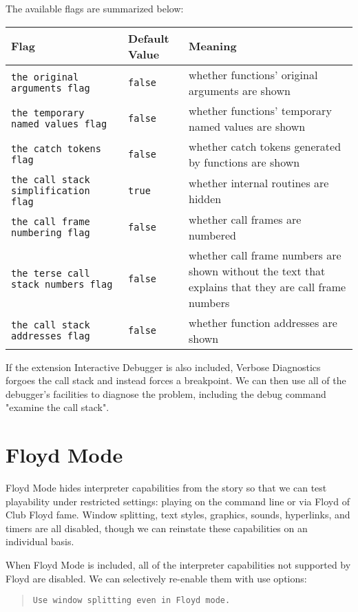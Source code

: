 \documentclass{book}
\newcommand{\impatiencechapter}[1]{\chapter{#1}\addcontentsline{toi}{chapter}{#1}}
\begin{document}
\begin{quote}
  
\end{quote}

The available flags are summarized below:

\hbox{}
\begin{longtable}{llp{6cm}}
  \midrule
  \textbf{Flag}&\textbf{Default Value}&\textbf{Meaning}\\
  \midrule
  \texttt{the original arguments flag}&\texttt{false}&whether functions' original arguments are shown\\
  \texttt{the temporary named values flag}&\texttt{false}&whether functions' temporary named values are shown\\
  \texttt{the catch tokens flag}&\texttt{false}&whether catch tokens generated by functions are shown\\
  \texttt{the call stack simplification flag}&\texttt{true}&whether internal routines are hidden\\
  \texttt{the call frame numbering flag}&\texttt{false}&whether call frames are numbered\\
  \texttt{the terse call stack numbers flag}&\texttt{false}&whether call frame numbers are shown without the text that explains that they are call frame numbers\\
  \texttt{the call stack addresses flag}&\texttt{false}&whether function addresses are shown\\
  \midrule
\end{longtable}

If the extension Interactive Debugger is also included, Verbose Diagnostics
forgoes the call stack and instead forces a breakpoint.  We can then use all of
the debugger's facilities to diagnose the problem, including the debug command
"examine the call stack".

\impatiencechapter{Floyd Mode}
\label{floyd-mode}

Floyd Mode hides interpreter capabilities from the story so that we can test
playability under restricted settings: playing on the command line or via Floyd
of Club Floyd fame.  Window splitting, text styles, graphics, sounds,
hyperlinks, and timers are all disabled, though we can reinstate these
capabilities on an individual basis.

When Floyd Mode is included, all of the interpreter capabilities not supported
by Floyd are disabled.  We can selectively re-enable them with use options:

\begin{quote}
  \lstinline @Use window splitting even in Floyd mode.@
\end{quote}
\end{document}
